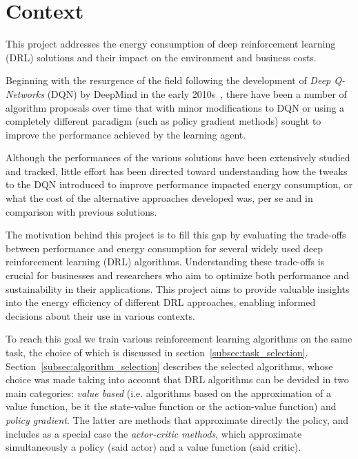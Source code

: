 \section{Context}
\label{sec:context}
This project addresses the energy consumption of deep reinforcement learning (DRL) solutions and their impact on the environment and business costs.

Beginning with the resurgence of the field following the development of \textit{Deep Q-Networks} (DQN) by DeepMind in the early 2010s~\cite{mnih:atari}\cite{mnih:human}, there have been a number of algorithm proposals over time that with minor modifications to DQN or using a completely different paradigm (such as policy gradient methods) sought to improve the performance achieved by the learning agent.

Although the performances of the various solutions have been extensively studied and tracked, little effort has been directed toward understanding how the tweaks to the DQN introduced to improve performance impacted energy consumption, or what the cost of the alternative approaches developed was, per se and in comparison with previous solutions.

The motivation behind this project is to fill this gap by evaluating the trade-offs between performance and energy consumption for several widely used deep reinforcement learning (DRL) algorithms. Understanding these trade-offs is crucial for businesses and researchers who aim to optimize both performance and sustainability in their applications. This project aims to provide valuable insights into the energy efficiency of different DRL approaches, enabling informed decisions about their use in various contexts.

To reach this goal we train various reinforcement learning algorithms on the same task, the choice of which is discussed in section~\vref{subsec:task_selection}. Section~\vref{subsec:algorithm_selection} describes the selected algorithms, whose choice was made taking into account that DRL algorithms can be devided in two main categories: \textit{value based} (i.e. algorithms based on the approximation of a value function, be it the state-value function or the action-value function) and \textit{policy gradient}. The latter are methods that approximate directly the policy, and includes as a special case the \textit{actor-critic methods}, which approximate simultaneously a policy (said actor) and a value function (said critic). 

